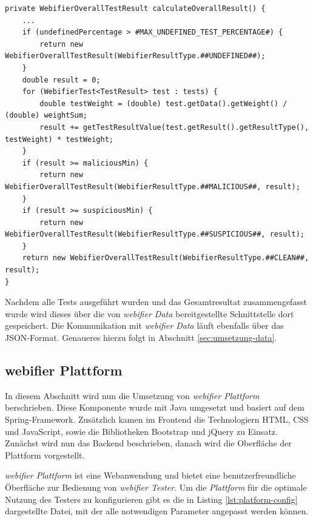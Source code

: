 \begin{scriptsize}
\begin{lstlisting}
private WebifierOverallTestResult calculateOverallResult() {
    ...
    if (undefinedPercentage > #MAX_UNDEFINED_TEST_PERCENTAGE#) {
        return new WebifierOverallTestResult(WebifierResultType.##UNDEFINED##);
    }
    double result = 0;
    for (WebifierTest<TestResult> test : tests) {
        double testWeight = (double) test.getData().getWeight() / (double) weightSum;
        result += getTestResultValue(test.getResult().getResultType(), testWeight) * testWeight;
    }
    if (result >= maliciousMin) {
        return new WebifierOverallTestResult(WebifierResultType.##MALICIOUS##, result);
    }
    if (result >= suspiciousMin) {
        return new WebifierOverallTestResult(WebifierResultType.##SUSPICIOUS##, result);
    }
    return new WebifierOverallTestResult(WebifierResultType.##CLEAN##, result);
}
\end{lstlisting}
\end{scriptsize}

Nachdem alle Tests ausgeführt wurden und das Gesamtresultat zusammengefasst wurde wird dieses über
die von \textit{webifier Data} bereitgestellte Schnittstelle dort gespeichert. Die Kommunikation mit
\textit{webifier Data} läuft ebenfalls über das \ac{JSON}-Format. Genaueres hierzu folgt in
Abschnitt \ref{sec:umsetzung-data}.

\subsection{webifier Plattform}

In diesem Abschnitt wird nun die Umsetzung von \textit{webifier Plattform} berschrieben. Diese
Komponente wurde mit Java umgesetzt und basiert auf dem Spring-Framework. Zusätzlich kamen im Frontend die Technologiern \ac{HTML}, \ac{CSS} und JavaScript, sowie die Bibliotheken Bootstrap und jQuery zu Einsatz. Zunächst wird nun das Backend beschrieben, danach wird die Oberfläche der Plattform vorgestellt.

\textit{webifier Plattform} ist eine Webanwendung und bietet eine benutzerfreundliche Öberfläche zur
Bedienung von \textit{webifier Tester}. Um die \textit{Plattform} für die optimale Nutzung des
Testers zu konfigurieren gibt es die in Listing \ref{lst:platform-config} dargestellte Datei, mit der alle notwendigen Parameter angepasst werden können.

